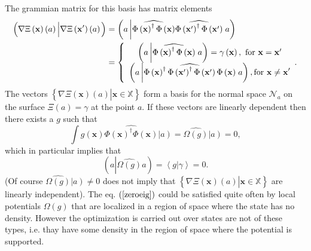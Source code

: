 \documentclass[aps,preprint]{revtex4}%
\begin{document}
The grammian matrix for this basis has matrix elements
\begin{align}
\left(  \overset{}{\nabla\Xi\left(  \mathbf{x}\right)  \left(  a\right)
}\left\vert \overset{}{\nabla\Xi\left(  \mathbf{x}^{\prime}\right)  \left(
a\right)  }\right.  \right)   &  =\left(  a\left\vert \widehat{\Phi\left(
\mathbf{x}\right)  ^{\dagger}\Phi\left(  \mathbf{x}\right)  }\widehat
{\Phi\left(  \mathbf{x}^{\prime}\right)  ^{\dagger}\Phi\left(  \mathbf{x}%
^{\prime}\right)  }\right.  a\right) \nonumber\\
&  =\left\{
\begin{array}
[c]{c}%
\left(  a\left\vert \widehat{\Phi\left(  \mathbf{x}\right)  ^{\dagger}%
\Phi\left(  \mathbf{x}\right)  }\right.  a\right)  =\gamma\left(
\mathbf{x}\right)  ,\text{ for }\mathbf{x=x}^{\prime}\\
\left(  a\left\vert \widehat{\Phi\left(  \mathbf{x}\right)  ^{\dagger}%
\Phi\left(  \mathbf{x}^{\prime}\right)  ^{\dagger}\Phi\left(  \mathbf{x}%
^{\prime}\right)  \Phi\left(  \mathbf{x}\right)  }\right.  a\right)
,\text{for }\mathbf{x\neq x}^{\prime}%
\end{array}
.\right.
\end{align}
The vectors $\left\{  \left.  \overset{}{\nabla\Xi\left(  \mathbf{x}\right)
\left(  a\right)  }\right\vert \mathbf{x\in}\mathbb{X}\right\}  $ form a basis
for the normal space $\mathcal{N}_{a}$ on the surface $\Xi\left(  a\right)
=\gamma$ at the point $a.$ If these vectors are linearly dependent then there
exists a $g$ such that
\begin{equation}
\int g\left(  \mathbf{x}\right)  \widehat{\Phi\left(  \mathbf{x}\right)
^{\dagger}\Phi\left(  \mathbf{x}\right)  }\left\vert \overset{}{a}\right)
=\widehat{\Omega\left(  g\right)  }\left\vert \overset{}{a}\right)  =0,
\label{roeig}%
\end{equation}
which in particular implies that
\begin{equation}
\left(  a\left\vert \widehat{\Omega\left(  g\right)  }\right.  a\right)
=\left\langle \left.  g\right\vert \gamma\right\rangle =0.
\end{equation}
(Of course $\widehat{\Omega\left(  g\right)  }\left\vert \overset{}{a}\right)
\neq0$ does not imply that $\left\{  \left.  \overset{}{\nabla\Xi\left(
\mathbf{x}\right)  \left(  a\right)  }\right\vert \mathbf{x\in}\mathbb{X}%
\right\}  $ are linearly independent). The eq. $\left(  \ref{zeroeig}\right)
$ could be satisfied quite often by local potentials $\Omega\left(  g\right)
$ that are localized in a region of space where the state has no density.
However the optimization is carried out over states are not of these types,
i.e. thay have some density in the region of space where the potential is supported.
\end{document}
